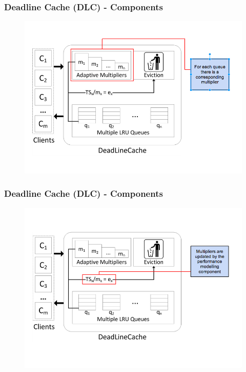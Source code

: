 \documentclass{beamer}
\begin{document}
\begin{frame}
  \frametitle{Deadline Cache (DLC) - Components}
  \begin{figure}
    \begin{center}
      \centerline{\includegraphics[scale=0.38]{img/DLC_ARC_2.png}}
    \end{center}
  \end{figure}
\end{frame}


\begin{frame}
  \frametitle{Deadline Cache (DLC) - Components}
  \begin{figure}
    \begin{center}
      \centerline{\includegraphics[scale=0.38]{img/DLC_ARC_3.png}}
    \end{center}
  \end{figure}
\end{frame}
\end{document}
